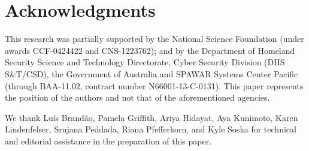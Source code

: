 \section{Acknowledgments}

This research was partially supported by the National Science Foundation
(under awards CCF-0424422 and CNS-1223762); and by the Department of
Homeland Security Science and Technology Directorate, Cyber Security
Division (DHS S\&T/CSD), the Government of Australia and SPAWAR Systems
Center Pacific (through BAA-11.02, contract number N66001-13-C-0131).
This paper represents the position of the authors and not that of the
aforementioned agencies.

We thank
%
Luís Brandão,
Pamela Griffith,
Ariya Hidayat,
Aya Kunimoto,
Karen Lindenfelser,
Srujana Peddada,
Riana Pfefferkorn,
and
Kyle Soska
%
for technical and editorial assistance in the preparation of
this paper.
